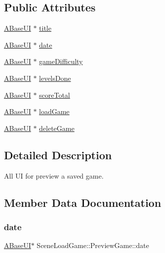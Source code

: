 \subsection*{Public Attributes}
\begin{DoxyCompactItemize}
\item 
\hyperlink{class_a_base_u_i}{A\+Base\+UI} $\ast$ \hyperlink{struct_scene_load_game_1_1_preview_game_a84ac5e731c48bcfe9290ec003dc07e8b}{title}
\item 
\hyperlink{class_a_base_u_i}{A\+Base\+UI} $\ast$ \hyperlink{struct_scene_load_game_1_1_preview_game_a40bf6f3d2f8ec511767c7aa17384a861}{date}
\item 
\hyperlink{class_a_base_u_i}{A\+Base\+UI} $\ast$ \hyperlink{struct_scene_load_game_1_1_preview_game_a78a6902f829d6a4983bc0da38b268599}{game\+Difficulty}
\item 
\hyperlink{class_a_base_u_i}{A\+Base\+UI} $\ast$ \hyperlink{struct_scene_load_game_1_1_preview_game_a6239afbcff39e5c4a14ab7a9259662a5}{levels\+Done}
\item 
\hyperlink{class_a_base_u_i}{A\+Base\+UI} $\ast$ \hyperlink{struct_scene_load_game_1_1_preview_game_ac239501a1f39bd30c32ea73b61016217}{score\+Total}
\item 
\hyperlink{class_a_base_u_i}{A\+Base\+UI} $\ast$ \hyperlink{struct_scene_load_game_1_1_preview_game_abd9cf660e217defbb684eabb394e6316}{load\+Game}
\item 
\hyperlink{class_a_base_u_i}{A\+Base\+UI} $\ast$ \hyperlink{struct_scene_load_game_1_1_preview_game_ac4ebd09c940b860ee24b87c17b10498d}{delete\+Game}
\end{DoxyCompactItemize}


\subsection{Detailed Description}
All UI for preview a saved game. 

\subsection{Member Data Documentation}
\mbox{\label{struct_scene_load_game_1_1_preview_game_a40bf6f3d2f8ec511767c7aa17384a861}} 
\subsubsection{\texorpdfstring{date}{date}}
{\footnotesize\ttfamily \hyperlink{class_a_base_u_i}{A\+Base\+UI}$\ast$ Scene\+Load\+Game\+::\+Preview\+Game\+::date}

